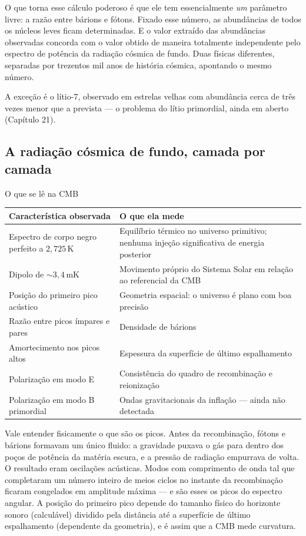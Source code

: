 \documentclass[11pt,a4paper]{article}
\begin{document}
O que torna esse cálculo poderoso é que ele tem essencialmente \emph{um} parâmetro livre: a razão entre bárions e fótons. Fixado esse número, as abundâncias de todos os núcleos leves ficam determinadas. E o valor extraído das abundâncias observadas concorda com o valor obtido de maneira totalmente independente pelo espectro de potência da radiação cósmica de fundo. Duas físicas diferentes, separadas por trezentos mil anos de história cósmica, apontando o mesmo número.

A exceção é o lítio-7, observado em estrelas velhas com abundância cerca de três vezes menor que a prevista --- o problema do lítio primordial, ainda em aberto (Capítulo 21).

\subsection*{A radiação cósmica de fundo, camada por camada}

\begin{lessonblock}{O que se lê na CMB}
\begin{tabular}{>{\raggedright\arraybackslash}p{}>{\raggedright\arraybackslash}p{}}
\toprule
Característica observada & O que ela mede \\
\midrule
Espectro de corpo negro perfeito a $2{,}725\,\mathrm{K}$ & Equilíbrio térmico no universo primitivo; nenhuma injeção significativa de energia posterior \\
Dipolo de $\sim3{,}4\,\mathrm{mK}$ & Movimento próprio do Sistema Solar em relação ao referencial da CMB \\
Posição do primeiro pico acústico & Geometria espacial: o universo é plano com boa precisão \\
Razão entre picos ímpares e pares & Densidade de bárions \\
Amortecimento nos picos altos & Espessura da superfície de último espalhamento \\
Polarização em modo E & Consistência do quadro de recombinação e reionização \\
Polarização em modo B primordial & Ondas gravitacionais da inflação --- ainda não detectada \\
\bottomrule
\end{tabular}
\end{lessonblock}

Vale entender fisicamente o que são os picos. Antes da recombinação, fótons e bárions formavam um único fluido: a gravidade puxava o gás para dentro dos poços de potência da matéria escura, e a pressão de radiação empurrava de volta. O resultado eram oscilações acústicas. Modos com comprimento de onda tal que completaram um número inteiro de meios ciclos no instante da recombinação ficaram congelados em amplitude máxima --- e são esses os picos do espectro angular. A posição do primeiro pico depende do tamanho físico do horizonte sonoro (calculável) dividido pela distância até a superfície de último espalhamento (dependente da geometria), e é assim que a CMB mede curvatura.
\end{document}
